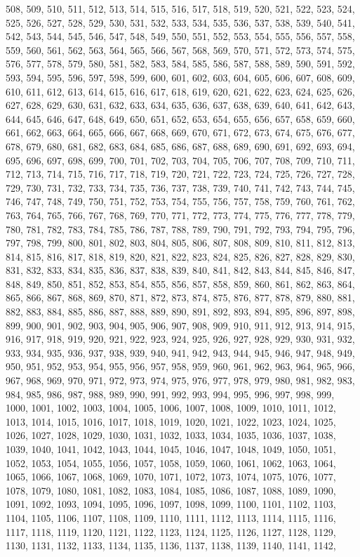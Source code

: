{{{{{{{{{{{{{508, 509, 510, 511, 512, 513, 514, 515, 516, 517, 518, 519, 520, 521, 522, 523, 524, 525, 526, 527, 528, 529, 530, 531, 532, 533, 534, 535, 536, 537, 538, 539, 540, 541, 542, 543, 544, 545, 546, 547, 548, 549, 550, 551, 552, 553, 554, 555, 556, 557, 558, 559, 560, 561, 562, 563, 564, 565, 566, 567, 568, 569, 570, 571, 572, 573, 574, 575, 576, 577, 578, 579, 580, 581, 582, 583, 584, 585, 586, 587, 588, 589, 590, 591, 592, 593, 594, 595, 596, 597, 598, 599, 600, 601, 602, 603, 604, 605, 606, 607, 608, 609, 610, 611, 612, 613, 614, 615, 616, 617, 618, 619, 620, 621, 622, 623, 624, 625, 626, 627, 628, 629, 630, 631, 632, 633, 634, 635, 636, 637, 638, 639, 640, 641, 642, 643, 644, 645, 646, 647, 648, 649, 650, 651, 652, 653, 654, 655, 656, 657, 658, 659, 660, 661, 662, 663, 664, 665, 666, 667, 668, 669, 670, 671, 672, 673, 674, 675, 676, 677, 678, 679, 680, 681, 682, 683, 684, 685, 686, 687, 688, 689, 690, 691, 692, 693, 694, 695, 696, 697, 698, 699, 700, 701, 702, 703, 704, 705, 706, 707, 708, 709, 710, 711, 712, 713, 714, 715, 716, 717, 718, 719, 720, 721, 722, 723, 724, 725, 726, 727, 728, 729, 730, 731, 732, 733, 734, 735, 736, 737, 738, 739, 740, 741, 742, 743, 744, 745, 746, 747, 748, 749, 750, 751, 752, 753, 754, 755, 756, 757, 758, 759, 760, 761, 762, 763, 764, 765, 766, 767, 768, 769, 770, 771, 772, 773, 774, 775, 776, 777, 778, 779, 780, 781, 782, 783, 784, 785, 786, 787, 788, 789, 790, 791, 792, 793, 794, 795, 796, 797, 798, 799, 800, 801, 802, 803, 804, 805, 806, 807, 808, 809, 810, 811, 812, 813, 814, 815, 816, 817, 818, 819, 820, 821, 822, 823, 824, 825, 826, 827, 828, 829, 830, 831, 832, 833, 834, 835, 836, 837, 838, 839, 840, 841, 842, 843, 844, 845, 846, 847, 848, 849, 850, 851, 852, 853, 854, 855, 856, 857, 858, 859, 860, 861, 862, 863, 864, 865, 866, 867, 868, 869, 870, 871, 872, 873, 874, 875, 876, 877, 878, 879, 880, 881, 882, 883, 884, 885, 886, 887, 888, 889, 890, 891, 892, 893, 894, 895, 896, 897, 898, 899, 900, 901, 902, 903, 904, 905, 906, 907, 908, 909, 910, 911, 912, 913, 914, 915, 916, 917, 918, 919, 920, 921, 922, 923, 924, 925, 926, 927, 928, 929, 930, 931, 932, 933, 934, 935, 936, 937, 938, 939, 940, 941, 942, 943, 944, 945, 946, 947, 948, 949, 950, 951, 952, 953, 954, 955, 956, 957, 958, 959, 960, 961, 962, 963, 964, 965, 966, 967, 968, 969, 970, 971, 972, 973, 974, 975, 976, 977, 978, 979, 980, 981, 982, 983, 984, 985, 986, 987, 988, 989, 990, 991, 992, 993, 994, 995, 996, 997, 998, 999, 1000, 1001, 1002, 1003, 1004, 1005, 1006, 1007, 1008, 1009, 1010, 1011, 1012, 1013, 1014, 1015, 1016, 1017, 1018, 1019, 1020, 1021, 1022, 1023, 1024, 1025, 1026, 1027, 1028, 1029, 1030, 1031, 1032, 1033, 1034, 1035, 1036, 1037, 1038, 1039, 1040, 1041, 1042, 1043, 1044, 1045, 1046, 1047, 1048, 1049, 1050, 1051, 1052, 1053, 1054, 1055, 1056, 1057, 1058, 1059, 1060, 1061, 1062, 1063, 1064, 1065, 1066, 1067, 1068, 1069, 1070, 1071, 1072, 1073, 1074, 1075, 1076, 1077, 1078, 1079, 1080, 1081, 1082, 1083, 1084, 1085, 1086, 1087, 1088, 1089, 1090, 1091, 1092, 1093, 1094, 1095, 1096, 1097, 1098, 1099, 1100, 1101, 1102, 1103, 1104, 1105, 1106, 1107, 1108, 1109, 1110, 1111, 1112, 1113, 1114, 1115, 1116, 1117, 1118, 1119, 1120, 1121, 1122, 1123, 1124, 1125, 1126, 1127, 1128, 1129, 1130, 1131, 1132, 1133, 1134, 1135, 1136, 1137, 1138, 1139, 1140, 1141, 1142, }}}}}}}}}}}}}
